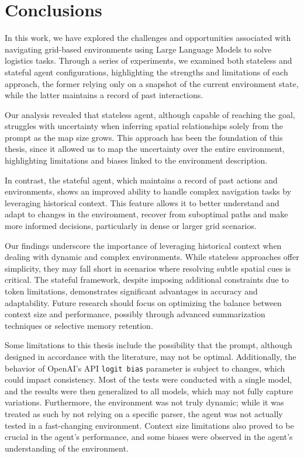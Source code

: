 \chapter{Conclusions}
\label{cha:conclusions}

In this work, we have explored the challenges and opportunities associated with navigating
grid-based environments using Large Language Models to solve logistics tasks.
Through a series of experiments, we examined both stateless and stateful agent configurations,
highlighting the strengths and limitations of each approach, the former relying only
on a snapshot of the current environment state, while the latter maintains a
record of past interactions.

Our analysis revealed that stateless agent, although capable of reaching the goal,
struggles with uncertainty when inferring spatial relationships solely from the
prompt as the map size grows. This approach has been the foundation of this thesis,
since it allowed us to map the uncertainty over the entire environment, highlighting
limitations and biases linked to the environment description.

In contrast, the stateful agent, which maintains a record of past actions and environments,
shows an improved ability to handle complex navigation tasks by leveraging
historical context. This feature allows it to better understand and adapt to changes
in the environment, recover from suboptimal paths and make more informed
decisions, particularly in dense or larger grid scenarios.

Our findings underscore the importance of leveraging historical context when dealing
with dynamic and complex environments. While stateless approaches offer
simplicity, they may fall short in scenarios where resolving subtle spatial cues
is critical. The stateful framework, despite imposing additional constraints due
to token limitations, demonstrates significant advantages in accuracy and
adaptability. Future research should focus on optimizing the balance between context
size and performance, possibly through advanced summarization techniques or
selective memory retention.

\vspace{1mm}
Some limitations to this thesis include the possibility that the prompt, although
designed in accordance with the literature, may not be optimal. Additionally,
the behavior of OpenAI's API \texttt{logit bias} parameter is subject to changes,
which could impact consistency. Most of the tests were conducted with a single model,
and the results were then generalized to all models, which may not fully capture
variations. Furthermore, the environment was not truly dynamic; while it was
treated as such by not relying on a specific parser, the agent was not actually tested
in a fast-changing environment. Context size limitations also proved to be
crucial in the agent's performance, and some biases were observed in the agent's
understanding of the environment.
\vspace{1mm}

